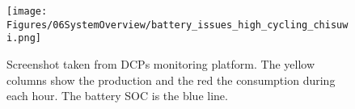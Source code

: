 \begin{figure}[h]
    \centering
    \texttt{[image: Figures/06SystemOverview/battery\_issues\_high\_cycling\_chisuwi.png]}
    \caption[Current control system weakness 2 - High SOC cycling]{Screenshot taken from DCPs monitoring platform. The yellow columns show the production and the red the consumption during each hour. The battery SOC is the blue line.}
    \label{fig:battery_issues_high_cycling_chisuwi}
\end{figure}

